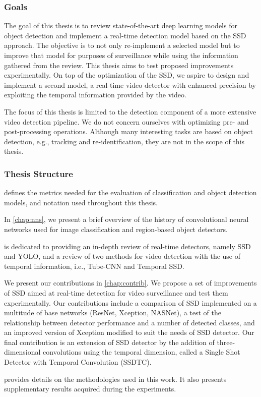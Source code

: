 \subsubsection{Goals}
The goal of this thesis is to review state-of-the-art deep learning models for object detection and implement a real-time detection model based on the SSD approach. The objective is to not only re-implement a selected model but to improve that model for purposes of surveillance while using the information gathered from the review. This thesis aims to test proposed improvements experimentally. On top of the optimization of the SSD, we aspire to design and implement a second model, a real-time video detector with enhanced precision by exploiting the temporal information provided by the video.

The focus of this thesis is limited to the detection component of a more extensive video detection pipeline. We do not concern ourselves with optimizing pre- and post-processing operations. Although many interesting tasks are based on object detection, e.g., tracking and re-identification, they are not in the scope of this thesis.

\subsubsection{Thesis Structure}
 defines the metrics needed for the evaluation of classification and object detection models, and notation used throughout this thesis. 

In \cref{chap:nns}, we present a brief overview of the history of convolutional neural networks used for image classification and region-based object detectors. 

 is dedicated to providing an in-depth review of real-time detectors, namely SSD and YOLO, and a review of two methods for video detection with the use of temporal information, i.e., Tube-CNN and Temporal SSD. 

We present our contributions in \cref{chap:contrib}. We propose a set of improvements of SSD aimed at real-time detection for video surveillance and test them experimentally. Our contributions include a comparison of SSD implemented on a multitude of base networks (ResNet, Xception, NASNet), a test of the relationship between detector performance and a number of detected classes, and an improved version of Xception modified to suit the needs of SSD detector. Our final contribution is an extension of SSD detector by the addition of three-dimensional convolutions using the temporal dimension, called a Single Shot Detector with Temporal Convolution (SSDTC).

 provides details on the methodologies used in this work. It also presents supplementary results acquired during the experiments.